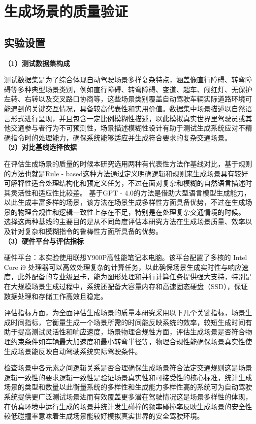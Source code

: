 \chapter{生成场景的质量验证}
\section{实验设置}
\textbf{（1）测试数据集构成} \par
测试数据集是为了综合体现自动驾驶场景多样复杂特点，涵盖像直行障碍、转弯障碍等多种典型场景类别，例如直行障碍、转弯障碍、变道、超车、闯红灯、无保护左转、右转以及交叉路口协商等，这些场景类别覆盖自动驾驶车辆实际道路环境可能遇到的关键交互情况，具备较高代表性和实用价值。数据集中场景描述以自然语言形式进行呈现，并且包含一定比例模糊性描述，以此模拟真实世界里驾驶员或其他交通参与者行为不可预测性，场景描述模糊性设计有助于测试生成系统应对不精确指令时的处理能力，确保系统能够适应并生成符合要求的复杂交通场景。\\
\indent\textbf{（2）对比基线选择依据} \par
在评估生成场景的质量的时候本研究选用两种有代表性方法作基线对比，基于规则的方法也就是Rule - based这种方法通过定义明确逻辑和规则来生成场景具有较好可解释性适合处理结构化和预定义任务，不过在面对复杂和模糊的自然语言描述时其灵活性和适应性比较差。
基于GPT - 4.0的方法是借助大型语言模型生成能力，以此生成丰富多样的场景，该方法在场景生成多样性方面具备优势，不过在生成场景的物理合规性和逻辑一致性上存在不足，特别是在处理复杂交通情境的时候。
选择这两种基线的主要目的是从不同角度评估本研究方法在生成场景质量、效率以及针对复杂和模糊指令的鲁棒性方面所具备的优势。\\
\indent\textbf{（3）硬件平台与评估指标} \par
硬件平台：本实验使用联想Y900P高性能笔记本电脑。该平台配置了多核的 Intel Core i9 处理器可以高效处理复杂的计算任务，以此确保场景生成实时性与响应速度，此外配备的专业级显卡，能为图形处理和并行计算任务提供强大支持，特别是在大规模场景生成过程中，系统还配备大容量内存和高速固态硬盘（SSD），保证数据处理和存储工作高效且稳定。

评估指标方面，为全面评估生成场景的质量本研究采用以下几个关键指标，场景生成时间指标，它衡量生成一个场景所需的时间能反映系统的效率，较短生成时间有助于提高测试灵活性和响应速度，场景物理合规性方面，评估生成场景是否符合物理约束条件如车辆最大加速度和最小转弯半径等，物理合规性能确保场景真实性使生成场景能反映自动驾驶系统实际驾驶条件。

检查场景中各元素之间逻辑关系是否合理确保生成场景符合法定交通规则这是场景逻辑一致性的要求逻辑一致性是验证场景真实性和可接受性的核心标准，统计生成场景的类型和数量以此衡量系统的多样性和生成能力多样性高的系统可为自动驾驶系统提供更广泛测试场景进而有效覆盖更多潜在驾驶情况这是场景多样性的体现，在仿真环境中运行生成的场景并统计发生碰撞的频率碰撞率反映生成场景的安全性较低碰撞率意味着生成场景能较好模拟真实世界的安全驾驶环境。




